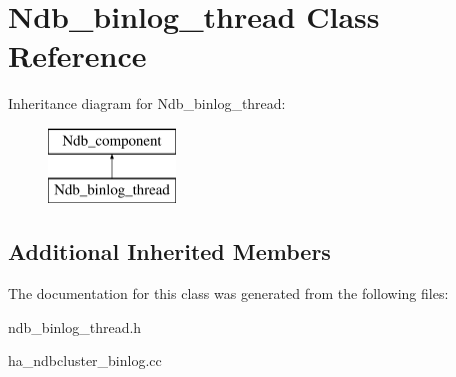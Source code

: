 \hypertarget{classNdb__binlog__thread}{}\section{Ndb\+\_\+binlog\+\_\+thread Class Reference}
\label{classNdb__binlog__thread}
Inheritance diagram for Ndb\+\_\+binlog\+\_\+thread\+:\begin{figure}[H]
\begin{center}
\leavevmode
\includegraphics[height=2.000000cm]{classNdb__binlog__thread}
\end{center}
\end{figure}
\subsection*{Additional Inherited Members}


The documentation for this class was generated from the following files\+:\begin{DoxyCompactItemize}
\item 
ndb\+\_\+binlog\+\_\+thread.\+h\item 
ha\+\_\+ndbcluster\+\_\+binlog.\+cc\end{DoxyCompactItemize}

